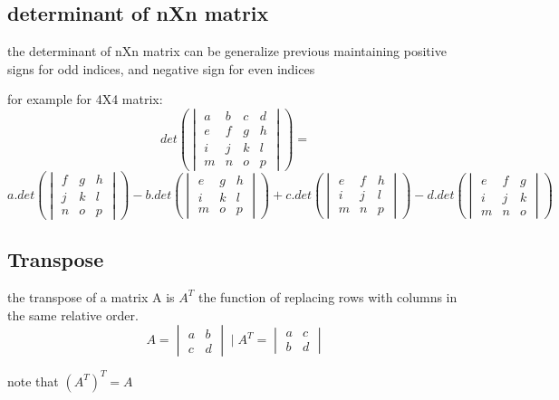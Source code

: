 \documentclass[4apaper,12pt]{book}
\begin{document}
\begin{description}
            \subsection{determinant of nXn matrix}
          \item the determinant of nXn matrix can be generalize previous maintaining positive signs for odd indices, and negative sign for even indices
          \item for example for 4X4 matrix:
            \begin{equation} det(\begin{vmatrix}a&b&c&d\\e&f&g&h\\i&j&k&l\\m&n&o&p\end{vmatrix}) =\end{equation}
                \begin{equation} a.det(\begin{vmatrix}f&g&h\\j&k&l\\n&o&p\end{vmatrix}) - b.det(\begin{vmatrix}e&g&h\\i&k&l\\m&o&p\end{vmatrix}) + c.det(\begin{vmatrix}e&f&h\\i&j&l\\m&n&p\end{vmatrix}) - d.det(\begin{vmatrix}e&f&g\\i&j&k\\m&n&o\end{vmatrix}) \end{equation}
                \subsection{Transpose}
              \item the transpose of a matrix A is $A^T$ the function of replacing rows with columns in the same relative order.
                \begin{equation}  A = \begin{vmatrix}a&b\\c&d\end{vmatrix} \mid A^T =\begin{vmatrix}a&c\\b&d\end{vmatrix} \end{equation}
              \item note that $(A^T)^T = A$

\end{description}
\end{document}
